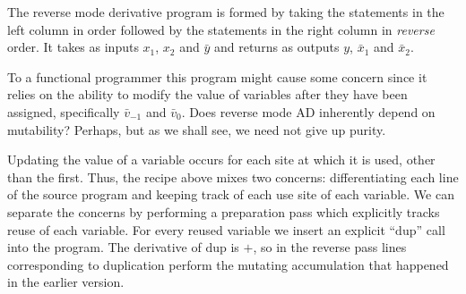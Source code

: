 \documentclass[12pt]{article}
\newcommand{\dup}{\mathrm{dup}}
\begin{document}
The reverse mode derivative program is formed by taking the statements
in the left column in order followed by the statements in the right
column in \emph{reverse} order.  It takes as inputs $x_1$, $x_2$ and
$\bar{y}$ and returns as outputs $y$, $\bar{x}_1$ and $\bar{x}_2$.

To a functional programmer this program might cause some concern since
it relies on the ability to modify the value of variables after they
have been assigned, specifically \(\bar{v}_{-1}\) and \(\bar{v}_0\).
Does reverse mode AD inherently depend on mutability?  Perhaps, but as
we shall see, we need not give up purity.

Updating the value of a variable occurs for each site at which it is
used, other than the first. Thus, the recipe above mixes two concerns:
differentiating each line of the source program and keeping track of
each use site of each variable.  We can separate the concerns by
performing a preparation pass which explicitly tracks reuse of each
variable.  For every reused variable we insert an explicit ``$\dup$''
call into the program.  The derivative of $\dup$ is $+$, so in the
reverse pass lines corresponding to duplication perform the mutating
accumulation that happened in the earlier version.
\end{document}

